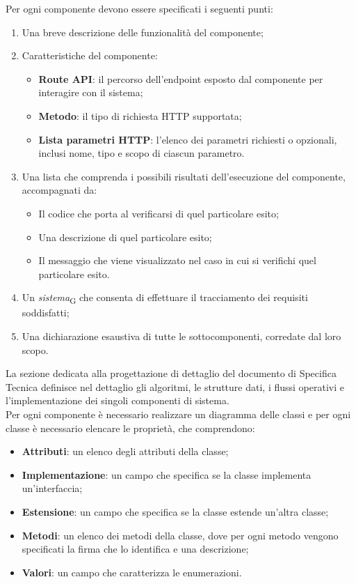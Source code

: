 Per ogni componente devono essere specificati i seguenti punti:
\begin{enumerate}
    \item Una breve descrizione delle funzionalità del componente;
    \item Caratteristiche del componente:
    \begin{itemize}
        \item \textbf{Route API}: il percorso dell’endpoint esposto dal componente per interagire con il sistema;
        \item \textbf{Metodo}: il tipo di richiesta HTTP supportata;
        \item \textbf{Lista parametri HTTP}: l'elenco dei parametri richiesti o opzionali, inclusi nome, tipo e scopo di ciascun parametro.
    \end{itemize}
    \item Una lista che comprenda i possibili risultati dell'esecuzione del componente, accompagnati da:
    \begin{itemize}
        \item Il codice che porta al verificarsi di quel particolare esito;
        \item Una descrizione di quel particolare esito;
        \item Il messaggio che viene visualizzato nel caso in cui si verifichi quel particolare esito.
    \end{itemize}
    \item Un \textit{sistema}\textsubscript{G} che consenta di effettuare il tracciamento dei requisiti soddisfatti;
    \item Una dichiarazione esaustiva di tutte le sottocomponenti, corredate dal loro scopo.
\end{enumerate}

La sezione dedicata alla progettazione di dettaglio del documento di Specifica Tecnica definisce nel dettaglio gli algoritmi, le strutture dati, i flussi operativi e l'implementazione dei singoli componenti di sistema.\\
Per ogni componente è necessario realizzare un diagramma delle classi e per ogni classe è necessario elencare le proprietà, che comprendono:
\begin{itemize}
    \item \textbf{Attributi}: un elenco degli attributi della classe;
    \item \textbf{Implementazione}: un campo che specifica se la classe implementa un'interfaccia;
    \item \textbf{Estensione}: un campo che specifica se la classe estende un'altra classe;
    \item \textbf{Metodi}: un elenco dei metodi della classe, dove per ogni metodo vengono specificati la firma che lo identifica e una descrizione;
    \item \textbf{Valori}: un campo che caratterizza le enumerazioni.
\end{itemize}

